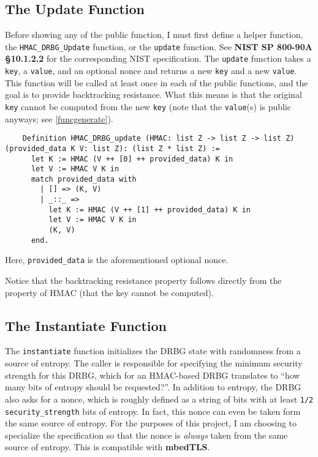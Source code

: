 \documentclass[pageno]{jpaper}
\newcommand{\stdtitle}[1]{\textbf{#1}}
\begin{document}
\subsection{The Update Function}
Before showing any of the public function, I must first define a helper function, the \lstinline{HMAC_DRBG_Update} function,  or the \lstinline{update} function. See \stdtitle{NIST SP 800-90A \S 10.1.2.2} for the corresponding NIST specification. The \lstinline{update} function takes a \lstinline{key}, a \lstinline{value}, and an optional nonce and returns a new \lstinline{key} and a new \lstinline{value}. This function will be called at least once in each of the public functions, and the goal is to provide backtracking resistance. What this means is that the original \lstinline{key} cannot be computed from the new \lstinline{key} (note that the \lstinline{value}(s) is public anyways; see \ref{funcgenerate}).

\begin{lstlisting}
    Definition HMAC_DRBG_update (HMAC: list Z -> list Z -> list Z) (provided_data K V: list Z): (list Z * list Z) :=
      let K := HMAC (V ++ [0] ++ provided_data) K in
      let V := HMAC V K in
      match provided_data with
        | [] => (K, V)
        | _::_ =>
          let K := HMAC (V ++ [1] ++ provided_data) K in
          let V := HMAC V K in
          (K, V)
      end.
\end{lstlisting}

Here, \lstinline{provided_data} is the aforementioned optional nonce.

Notice that the backtracking resistance property follows directly from the property of HMAC (that the key cannot be computed).

\subsection{The Instantiate Function}

The \lstinline{instantiate} function initializes the DRBG state with randomness from a source of entropy. The caller is responsible for specifying the minimum security strength for this DRBG, which for an HMAC-based DRBG translates to “how many bits of entropy should be requested?”. In addition to entropy, the DRBG also asks for a nonce, which is roughly defined as a string of bits with at least \lstinline{1/2 security_strength} bits of entropy. In fact, this nonce can even be taken form the same source of entropy. For the purposes of this project, I am choosing to specialize the specification so that the nonce is \textit{always} taken from the same source of entropy. This is compatible with \stdtitle{mbedTLS}.
\end{document}
